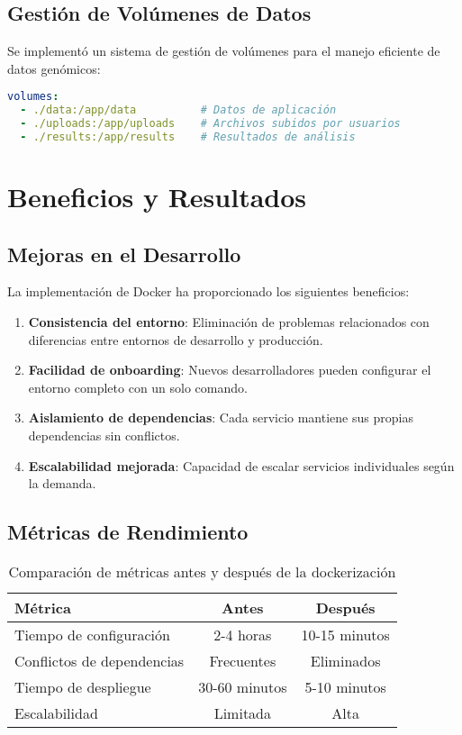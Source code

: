 \documentclass[12pt,a4paper]{article}
\begin{document}
\subsection{Gestión de Volúmenes de Datos}

Se implementó un sistema de gestión de volúmenes para el manejo eficiente de datos genómicos:

\begin{lstlisting}[language=yaml, caption=Configuración de volúmenes de datos]
volumes:
  - ./data:/app/data          # Datos de aplicación
  - ./uploads:/app/uploads    # Archivos subidos por usuarios
  - ./results:/app/results    # Resultados de análisis
\end{lstlisting}

\section{Beneficios y Resultados}

\subsection{Mejoras en el Desarrollo}

La implementación de Docker ha proporcionado los siguientes beneficios:

\begin{enumerate}
    \item \textbf{Consistencia del entorno}: Eliminación de problemas relacionados con diferencias entre entornos de desarrollo y producción.
    
    \item \textbf{Facilidad de onboarding}: Nuevos desarrolladores pueden configurar el entorno completo con un solo comando.
    
    \item \textbf{Aislamiento de dependencias}: Cada servicio mantiene sus propias dependencias sin conflictos.
    
    \item \textbf{Escalabilidad mejorada}: Capacidad de escalar servicios individuales según la demanda.
\end{enumerate}

\subsection{Métricas de Rendimiento}

\begin{table}[h]
\centering
\begin{tabular}{|l|c|c|}
\hline
\textbf{Métrica} & \textbf{Antes} & \textbf{Después} \\
\hline
Tiempo de configuración & 2-4 horas & 10-15 minutos \\
Conflictos de dependencias & Frecuentes & Eliminados \\
Tiempo de despliegue & 30-60 minutos & 5-10 minutos \\
Escalabilidad & Limitada & Alta \\
\hline
\end{tabular}
\caption{Comparación de métricas antes y después de la dockerización}
\end{table}
\end{document}
